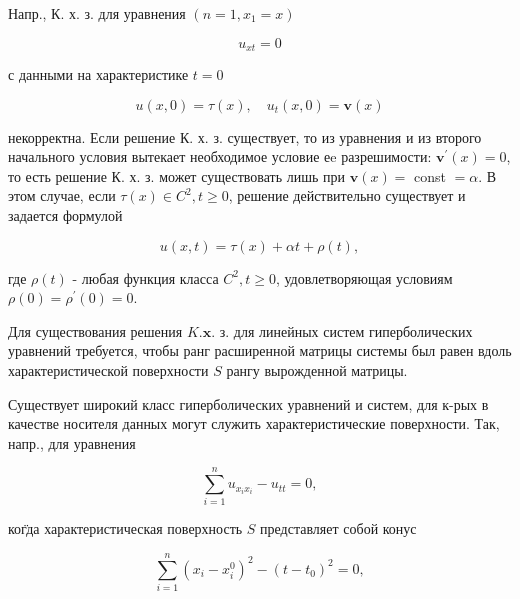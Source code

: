 \documentclass[10pt]{article}
\begin{document}
Напр., К. х. з. для уравнения $\left(n=1, x_{1}=x\right)$



\[

u_{x t}=0

\]



с данными на характеристике $t=0$



\[

u(x, 0)=\tau(x), \quad u_{t}(x, 0)=\boldsymbol{v}(x)

\]



некорректна. Если решение К. х. з. существует, то из уравнения и из второго начального условия вытекает необходимое условие еe разрешимости: $\boldsymbol{v}^{\prime}(x)=0$, то есть решение К. х. з. может существовать лишь при $\boldsymbol{v}(x)=$ const $=\alpha$. В этом случае, если $\tau(x) \in C^{2}, t \geqslant 0$, решение действительно существует и задается формулой



\[

u(x, t)=\tau(x)+\alpha t+\rho(t),

\]



где $\rho(t)$ - любая функция класса $C^{2}, t \geqslant 0$, удовлетворяющая условиям $\rho(0)=\rho^{\prime}(0)=0$.



Для существования решения $K . \mathbf{x}$. з. для линейных систем гиперболических уравнений требуется, чтобы ранг расширенной матрицы системы был равен вдоль характеристической поверхности $S$ рангу вырожденной матрицы.



Существует широкий класс гиперболических уравнений и систем, для к-рых в качестве носителя данных могут служить характеристические поверхности. Так, напр., для уравнения



\[

\sum_{i=1}^{n} u_{x_{i} x_{i}}-u_{t t}=0,

\]



ког̈да характеристическая поверхность $S$ представляет собой конус



\[

\sum_{i=1}^{n}\left(x_{i}-x_{i}^{0}\right)^{2}-\left(t-t_{0}\right)^{2}=0,

\]
\end{document}
